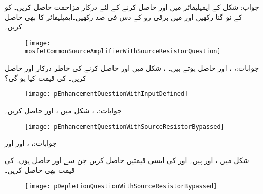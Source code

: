 جواب:
شکل  کے ایمپلیفائر میں   اور  حاصل کرنے کے لئے درکار مزاحمت حاصل کریں۔ کو  کے نو گنا رکھیں اور  میں برقی رو  کے دس فی صد رکھیں۔ایمپلیفائر کا  بھی حاصل کریں۔
\begin{figure}
\centering
\texttt{[image: mosfetCommonSourceAmplifierWithSourceResistorQuestion]}
\caption{}
\label{شکل_ماسفیٹ_سوال_مشترک_مخارج_بمع_مزاحمت}
\end{figure}

جوابات:، ،  اور  حاصل ہوتے ہیں۔ ، 
شکل  میں  اور  حاصل کرنے کی خاطر درکار  اور  حاصل کریں۔ کی قیمت کیا ہو گی؟
\begin{figure}
\centering
\texttt{[image: pEnhancementQuestionWithInputDefined]}
\caption{}
\label{شکل_ماسفیٹ_جمع_ماسفیٹ_سوال_درکار_مداخل}
\end{figure}

جوابات:، ،  
شکل  میں ،  اور  حاصل کریں۔
\begin{figure}
\centering
\texttt{[image: pEnhancementQuestionWithSourceResistorBypassed]}
\caption{}
\label{شکل_ماسفیٹ_جمع_ماسفیٹ_سوال_مزاحمت_پر_کپیسٹر}
\end{figure}

جوابات:، ،  اور  اور 

شکل  میں ،
  اور  ہیں۔ اور  کی ایسی قیمتیں حاصل کریں جن سے  اور  حاصل ہوں۔ کی قیمت بھی حاصل کریں۔
\begin{figure}
\centering
\texttt{[image: pDepletionQuestionWithSourceResistorBypassed]}
\caption{}
\label{شکل_ماسفیٹ_جمع_ماسفیٹ_گھٹاتا_سوال_مزاحمت_پر_کپیسٹر}
\end{figure}

